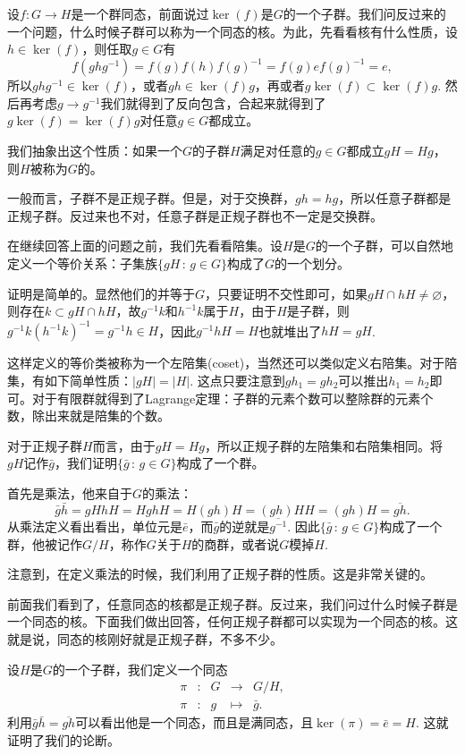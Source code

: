 \para 设$f:G\to H$是一个群同态，前面说过$\ker(f)$是$G$的一个子群。我们问反过来的一个问题，什么时候子群可以称为一个同态的核。为此，先看看核有什么性质，设$h\in \ker(f)$，则任取$g\in G$有
\[
	f\left(ghg^{-1}\right)=f(g)f(h)f(g)^{-1}=f(g)ef(g)^{-1}=e,
\]
所以$ghg^{-1}\in \ker(f)$，或者$gh \in \ker(f)g$，再或者$g\ker(f)\subset \ker(f)g$. 然后再考虑$g\to g^{-1}$我们就得到了反向包含，合起来就得到了$g\ker(f)=\ker(f)g$对任意$g\in G$都成立。

我们抽象出这个性质：如果一个$G$的子群$H$满足对任意的$g\in G$都成立$gH=Hg$，则$H$被称为$G$的。

一般而言，子群不是正规子群。但是，对于交换群，$gh=hg$，所以任意子群都是正规子群。反过来也不对，任意子群是正规子群也不一定是交换群。

\para 在继续回答上面的问题之前，我们先看看陪集。设$H$是$G$的一个子群，可以自然地定义一个等价关系：子集族$\{gH\,:\, g\in G\}$构成了$G$的一个划分。

证明是简单的。显然他们的并等于$G$，只要证明不交性即可，如果$gH\cap hH\neq \varnothing$，则存在$k\subset gH\cap hH$，故$g^{-1}k$和$h^{-1}k$属于$H$，由于$H$是子群，则$g^{-1}k\left(h^{-1}k\right)^{-1}=g^{-1}h\in H$，因此$g^{-1}hH=H$也就堆出了$hH=gH$.

这样定义的等价类被称为一个左陪集(coset)，当然还可以类似定义右陪集。对于陪集，有如下简单性质：$|gH|=|H|$. 这点只要注意到$gh_1=gh_2$可以推出$h_1=h_2$即可。对于有限群就得到了Lagrange定理：子群的元素个数可以整除群的元素个数，除出来就是陪集的个数。

\para 对于正规子群$H$而言，由于$gH=Hg$，所以正规子群的左陪集和右陪集相同。将$gH$记作$\bar{g}$，我们证明$\{\bar{g}\,:\, g\in G\}$构成了一个群。

首先是乘法，他来自于$G$的乘法：
\[
	\bar{g}\bar{h}=gHhH=HghH=H(gh)H=(gh)HH=(gh)H=\overline{gh}.
\]
从乘法定义看出看出，单位元是$\bar{e}$，而$\bar{g}$的逆就是$\overline{g^{-1}}$. 因此$\{\bar{g}\,:\, g\in G\}$构成了一个群，他被记作$G/H$，称作$G$关于$H$的商群，或者说$G$模掉$H$.

注意到，在定义乘法的时候，我们利用了正规子群的性质。这是非常关键的。

\para 前面我们看到了，任意同态的核都是正规子群。反过来，我们问过什么时候子群是一个同态的核。下面我们做出回答，任何正规子群都可以实现为一个同态的核。这就是说，同态的核刚好就是正规子群，不多不少。

设$H$是$G$的一个子群，我们定义一个同态
\[
	\begin{array}{ccccc}
		\pi &:&G &\to& G/H,\\
		\pi &:&g &\mapsto& \bar{g}.
	\end{array}
\]
利用$\bar{g}\bar{h}=\overline{gh}$可以看出他是一个同态，而且是满同态，且$\ker(\pi)=\bar{e}=H$. 这就证明了我们的论断。

